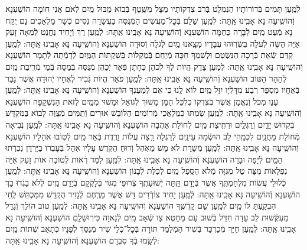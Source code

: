 \documentclass[twoside, openany, parskip=half, 11pt]{book}
\begin{document}
\begin{small}
לְֿמַֽעַן תָּמִים בְּֿדוֹרוֹתָיו הַנִּמְלָט בְּֿרֹב צִדְקוֹתָיו
מֻצָּל מִשֶּֽׁטֶף בְּֿבוֹא מַבּוּל מַֽיִם לְֿאֹם אֲנִי חוֹמָה הוֹשַׁעְנָא וְֿהוֹשִֽׁיעָה נָּא אָבִֽינוּ אַֽתָּה:
לְֿמַֽעַן שָׁלֵם בְּֿכׇל־מַעֲשִׂים הַמְֿנֻסֶּה בַּעֲשָׂרָה נִסִּים
כְּֿשָׁר מַלְאָכִים נָם יֻקַּח נָא מְֿעַט מַֽיִם לְֿבָרָה כַּחַמָּה הוֹשַׁעְנָא וְֿהוֹשִֽׁיעָה נָּא אָבִֽינוּ אַֽתָּה:
לְֿמַֽעַן רַךְ וְֿיָחִיד נֶחֱנַט לְֿמֵאָה זָעַק אַיֵּה הַשֶּׂה לְֿעֹלָה
בִּשְּֿׂרֽוּהוּ עֲבָדָיו מָצָֽאנוּ מַֽיִם לְֿגֹלָה וְֿסוּרָה הוֹשַׁעְנָא וְֿהוֹשִֽׁיעָה נָּא אָבִֽינוּ אַֽתָּה:
לְֿמַֽעַן קִדַּם שְֿׂאֵת בְּֿרָכָה הַנִּשְׂטַם וּלְשִׁמְךָ חִכָּה
מְֿיַחֵם בְּֿמַקְלוֹת בְּֿשִׁקֲתוֹת הַמַּֽיִם לְֿדָמְֿתָה לְֿתָמָר הוֹשַׁעְנָא וְֿהוֹשִֽׁיעָה נָּא אָבִֽינוּ אַֽתָּה:
לְֿמַעַן צָדַק הֱיוֹת לְֿךָ לְֿכֹהֵן כֶּחָתָן פְּֿאֵר יְֿכַהֵן
מְֿנֻסֶּה בְּֿמַסָּה בְּֿמֵי מְֿרִֽיבַת מַֽיִם לְֿהָהָר הַטּוֹב הוֹשַׁעְנָא וְֿהוֹשִֽׁיעָה נָּא אָבִֽינוּ אַֽתָּה:
לְֿמַֽעַן פֹּאַר הֱיוֹת גְּֿבִיר לְֿאֶחָיו יְֿהוּדָה אֲשֶׁר גָּבַר בְּֿאֶחָיו
מִסְפַּר רֹֽבַע מִדָּלְֿיָו יִזַּל מַֽיִם לוֹא לָֽנוּ כִּי אִם לְֿמַעַנְךָ הוֹשַׁעְנָא וְֿהוֹשִֽׁיעָה נָּא אָבִֽינוּ אַֽתָּה:
לְֿמַֽעַן עָנָו מִכֹּל וְֿנֶאֱמָן אֲשֶׁר בְּֿצִדְקוֹ כִּלְכֵּל הַמָּן
מָשׁוּךְ לְֿגוֹאֵל וּמָשׁוּי מִמַּֽיִם לְֿזֹאת הַנִּשְׁקָפָה הוֹשַׁעְנָא וְֿהוֹשִֽׁיעָה נָּא אָבִֽינוּ אַֽתָּה:
לְֿמַֽעַן שַׂמְתּוֹ כְּֿמַלְאֲכֵי מְֿרוֹמִים הַלּוֹבֵשׁ אוּרִים וְֿתֻמִּים
מְֿצֻוֶּה לָבוֹא בַּמִּקְדָּשׁ בְּֿקִדּוּשׁ יָדַֽיִם וְֿרַגְלַֽיִם וּרְחִֽיצַת מַֽיִם
לְֿחוֹלַת אַהֲבָה הוֹשַׁעְנָא וְֿהוֹשִֽׁיעָה נָּא אָבִֽינוּ אַֽתָּה:
לְֿמַֽעַן נְֿבִיאָה מְֿחוֹלַת מַחֲנַֽיִם לִכְמֵֽהֵי לֵב הוּשְֿׂמָה עֵינַֽיִם
לְֿרַגְלָהּ רָֽצָה עֲלוֹת וָרֶֽדֶת בְּֿאֵר מַֽיִם לְֿטֽוֹבוּ אֹהָלָיו הוֹשַׁעְנָא וְֿהוֹשִֽׁיעָה נָּא אָבִֽינוּ אַֽתָּה:
לְֿמַֽעַן מְֿשָׁרֵת לֹא מָשׁ מֵאֹֽהֶל וְֿרוּחַ הַקֹּֽדֶשׁ עָלָיו אִהֵל
בְּֿעָבְרוֹ בַיַּרְדֵּן נִכְרְֿתוּ הַמַּֽיִם לְֿיָפָה וּבָרָה הוֹשַׁעְנָא וְֿהוֹשִֽׁיעָה נָּא אָבִֽינוּ אַֽתָּה:
לְֿמַֽעַן לִמַּד רְֿאוֹת לְֿטוֹבָה אוֹת זָעַק אַיֵּה נִפְלָאוֹת
מִצָּה טַל מִגִּזָּה מְֿלֹא הַסֵּֽפֶל מַֽיִם לְֿכַלַּת לְֿבָנוֹן הוֹשַׁעְנָא וְֿהוֹשִֽׁיעָה נָּא אָבִֽינוּ אַֽתָּה:
לְֿמַֽעַן כְּֿלוּלֵי עֲשׂוֹת מִלְחַמְתֶּֽךָ אֲשֶׁר בְּֿיָדָם תַּֽתָּה יְֿשׁוּעָתֶֽךָ
צְֿרוּפֵי מִגּוֹי בְּֿלָקְֿקָם בְּֿיָדָם מַֽיִם לְֿלֹא בָגְֿדוּ בָךְ הוֹשַׁעְנָא וְֿהוֹשִֽׁיעָה נָּא אָבִֽינוּ אַֽתָּה:
לְֿמַֽעַן יָחִיד צוֹרְֿרִים דָּשׁ אֲשֶׁר מֵרֶֽחֶם לְֿנָזִיר הֻקְדָּשׁ
מִמַּכְתֵּשׁ לֶֽחִי הִבְקַֽעְתָּ לּוֹ מַֽיִם לְֿמַֽעַן שֵׁם קָדְֿשֶֽׁךָ הוֹשַׁעְנָא וְֿהוֹשִֽׁיעָה נָּא אָבִֽינוּ אַֽתָּה:
לְֿמַֽעַן טוֹב הוֹלֵךְ וְֿגָדֵל מֵעִקְּֿשׁוּת לֵב עֵדָה חִדֵּל
בְּֿשׁוּב עָם מֵחֵטְא צָו שְֿׁאָב מַֽיִם לְֿנָאוָה כִּירֽוּשָׁלָֽםִ הוֹשַׁעְנָא וְֿהוֹשִֽׁיעָה נָּא אָבִֽינוּ אַֽתָּה:
לְֿמַֽעַן חַיָּךְ מְֿכַרְכֵּר בְּֿשִׁיר הַמְֿלַמֵּד תּוֹרָה בְּֿכׇל־כְּֿלֵי שִׁיר
מְֿנַסֵּךְ לְֿפָנָיו כְּֿתָאַב שְֿׁתוֹת מַֽיִם לְֿשָֽׂמוּ בְֿךָ סִבְרָם הוֹשַׁעְנָא וְֿהוֹשִֽׁיעָה נָּא אָבִֽינוּ אַֽתָּה:

\end{small}
\end{document}
